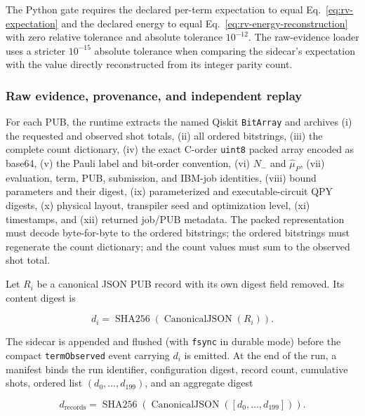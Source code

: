 The Python gate requires the declared per-term expectation to equal
Eq.~\eqref{eq:rv-expectation} and the declared energy to equal
Eq.~\eqref{eq:rv-energy-reconstruction} with zero relative tolerance and
absolute tolerance $10^{-12}$.  The raw-evidence loader uses a stricter
$10^{-15}$ absolute tolerance when comparing the sidecar's expectation with
the value directly reconstructed from its integer parity count.

\subsubsection{Raw evidence, provenance, and independent replay}

For each PUB, the runtime extracts the named Qiskit \texttt{BitArray} and
archives (i) the requested and observed shot totals, (ii) all ordered
bitstrings, (iii) the complete count dictionary, (iv) the exact C-order
\texttt{uint8} packed array encoded as base64, (v) the Pauli label and bit-order
convention, (vi) $N_-$ and $\widehat{\mu}_P$, (vii) evaluation, term, PUB,
submission, and IBM-job identities, (viii) bound parameters and their digest,
(ix) parameterized and executable-circuit QPY digests, (x) physical layout,
transpiler seed and optimization level, (xi) timestamps, and (xii) returned
job/PUB metadata.  The packed representation must decode byte-for-byte to the
ordered bitstrings; the ordered bitstrings must regenerate the count
dictionary; and the count values must sum to the observed shot total.

Let $R_i$ be a canonical JSON PUB record with its own digest field removed.
Its content digest is

\begin{equation}
  d_i=\operatorname{SHA256}(\operatorname{CanonicalJSON}(R_i)).
  \label{eq:rv-record-digest}
\end{equation}

The sidecar is appended and flushed (with \texttt{fsync} in durable mode)
before the compact \texttt{termObserved} event carrying $d_i$ is emitted.  At
the end of the run, a manifest binds the run identifier, configuration digest,
record count, cumulative shots, ordered list $(d_0,\ldots,d_{199})$, and an
aggregate digest

\begin{equation}
  d_{\mathrm{records}} =
  \operatorname{SHA256}(\operatorname{CanonicalJSON}([d_0,\ldots,d_{199}])).
  \label{eq:rv-manifest-aggregate}
\end{equation}

